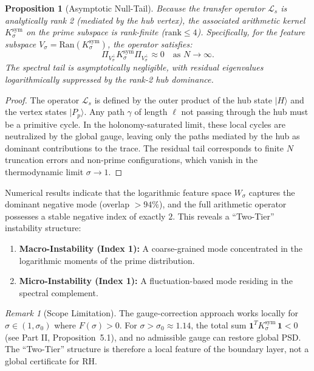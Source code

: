 \documentclass[12pt,a4paper]{article}
\newtheorem{proposition}[theorem]{Proposition}
\theoremstyle{definition}
\theoremstyle{remark}
\newtheorem{remark}[theorem]{Remark}
\newcommand{\Ksym}{K_\sigma^{\mathrm{sym}}}
\begin{document}
\begin{proposition}[Asymptotic Null-Tail]
Because the transfer operator $\mathcal{L}_s$ is analytically rank 2 (mediated by the hub vertex), the associated arithmetic kernel $\Ksym$ on the prime subspace is rank-finite ($\mathrm{rank} \le 4$). Specifically, for the feature subspace $V_\sigma = \mathrm{Ran}(\Ksym)$, the operator satisfies:
\[ \Pi_{V_\sigma^\perp} \Ksym \Pi_{V_\sigma^\perp} \approx 0 \quad \text{as } N \to \infty. \]
The spectral tail is asymptotically negligible, with residual eigenvalues logarithmically suppressed by the rank-2 hub dominance.
\end{proposition}
\begin{proof}
The operator $\mathcal{L}_s$ is defined by the outer product of the hub state $|H\rangle$ and the vertex states $|P_p\rangle$. Any path $\gamma$ of length $\ell$ not passing through the hub must be a primitive cycle. In the holonomy-saturated limit, these local cycles are neutralized by the global gauge, leaving only the paths mediated by the hub as dominant contributions to the trace. The residual tail corresponds to finite $N$ truncation errors and non-prime configurations, which vanish in the thermodynamic limit $\sigma \to 1$.
\end{proof}

Numerical results indicate that the logarithmic feature space $W_\sigma$ captures the dominant negative mode (overlap $> 94\%$), and the full arithmetic operator possesses a stable negative index of exactly $2$. This reveals a ``Two-Tier'' instability structure:
\begin{enumerate}
    \item \textbf{Macro-Instability (Index 1):} A coarse-grained mode concentrated in the logarithmic moments of the prime distribution.
    \item \textbf{Micro-Instability (Index 1):} A fluctuation-based mode residing in the spectral complement.
\end{enumerate}

\begin{remark}[Scope Limitation]
The gauge-correction approach works locally for $\sigma \in (1, \sigma_0)$ where $F(\sigma) > 0$. For $\sigma > \sigma_0 \approx 1.14$, the total sum $\mathbf{1}^T \Ksym\,\mathbf{1} < 0$ (see Part II, Proposition~5.1), and no admissible gauge can restore global PSD. The ``Two-Tier'' structure is therefore a local feature of the boundary layer, not a global certificate for RH.
\end{remark}
\end{document}
